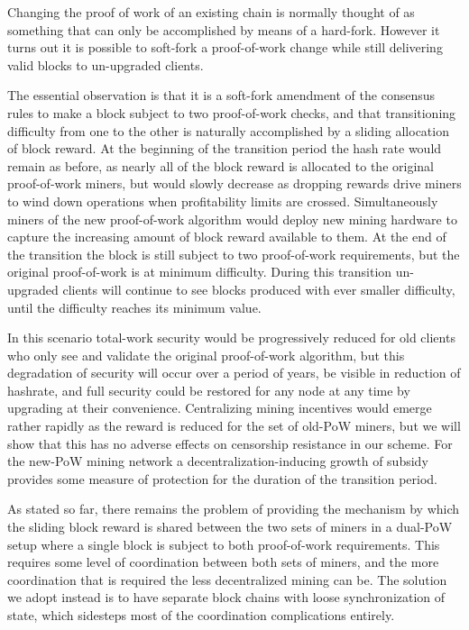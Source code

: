 Changing the proof of work of an existing chain is normally thought of
as something that can only be accomplished by means of a hard-fork.
However it turns out it is possible to soft-fork a proof-of-work
change while still delivering valid blocks to un-upgraded clients.

The essential observation is that it is a soft-fork amendment of the
consensus rules to make a block subject to two proof-of-work checks,
and that transitioning difficulty from one to the other is naturally
accomplished by a sliding allocation of block reward.  At the
beginning of the transition period the hash rate would remain as
before, as nearly all of the block reward is allocated to the original
proof-of-work miners, but would slowly decrease as dropping rewards
drive miners to wind down operations when profitability limits are
crossed.  Simultaneously miners of the new proof-of-work algorithm
would deploy new mining hardware to capture the increasing amount of
block reward available to them.  At the end of the transition the
block is still subject to two proof-of-work requirements, but the
original proof-of-work is at minimum difficulty.  During this
transition un-upgraded clients will continue to see blocks produced
with ever smaller difficulty, until the difficulty reaches its minimum
value.

In this scenario total-work security would be progressively reduced
for old clients who only see and validate the original proof-of-work
algorithm, but this degradation of security will occur over a period
of years, be visible in reduction of hashrate, and full security could
be restored for any node at any time by upgrading at their
convenience.  Centralizing mining incentives would emerge rather
rapidly as the reward is reduced for the set of old-PoW miners, but we
will show that this has no adverse effects on censorship resistance in
our scheme.  For the new-PoW mining network a
decentralization-inducing growth of subsidy provides some measure of
protection for the duration of the transition period.

As stated so far, there remains the problem of providing the mechanism
by which the sliding block reward is shared between the two sets of
miners in a dual-PoW setup where a single block is subject to both
proof-of-work requirements.  This requires some level of coordination
between both sets of miners, and the more coordination that is
required the less decentralized mining can be.  The solution we adopt
instead is to have separate block chains with loose synchronization of
state, which sidesteps most of the coordination complications
entirely.

